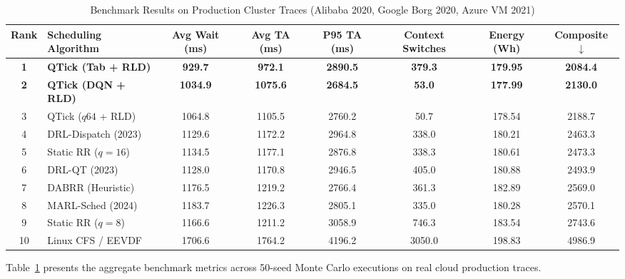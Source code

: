 \documentclass[journal]{IEEEtran}
\begin{document}
\begin{table}[t]
\centering
\caption{Benchmark Results on Production Cluster Traces (Alibaba 2020, Google Borg 2020, Azure VM 2021)}
\label{tab:benchmark_real}
\begin{tabular}{clcccccc}
\toprule
\textbf{Rank} & \textbf{Scheduling Algorithm} & \textbf{Avg Wait (ms)} & \textbf{Avg TA (ms)} & \textbf{P95 TA (ms)} & \textbf{Context Switches} & \textbf{Energy (Wh)} & \textbf{Composite $\downarrow$} \\
\midrule
\textbf{1} & \textbf{QTick (Tab + RLD)} & \textbf{929.7} & \textbf{972.1} & \textbf{2890.5} & \textbf{379.3} & \textbf{179.95} & \textbf{2084.4} \\
\textbf{2} & \textbf{QTick (DQN + RLD)} & \textbf{1034.9} & \textbf{1075.6} & \textbf{2684.5} & \textbf{53.0} & \textbf{177.99} & \textbf{2130.0} \\
3 & QTick ($q64$ + RLD) & 1064.8 & 1105.5 & 2760.2 & 50.7 & 178.54 & 2188.7 \\
4 & DRL-Dispatch (2023) & 1129.6 & 1172.2 & 2964.8 & 338.0 & 180.21 & 2463.3 \\
5 & Static RR ($q=16$) & 1134.5 & 1177.1 & 2876.8 & 338.3 & 180.61 & 2473.3 \\
6 & DRL-QT (2023) \cite{zhang2023deep} & 1128.0 & 1170.8 & 2946.5 & 405.0 & 180.88 & 2493.9 \\
7 & DABRR (Heuristic) & 1176.5 & 1219.2 & 2766.4 & 361.3 & 182.89 & 2569.0 \\
8 & MARL-Sched (2024) \cite{chen2023multi} & 1183.7 & 1226.3 & 2805.1 & 335.0 & 180.28 & 2570.1 \\
9 & Static RR ($q=8$) & 1166.6 & 1211.2 & 3058.9 & 746.3 & 183.54 & 2743.6 \\
10 & Linux CFS / EEVDF \cite{zijlstra2023eevdf} & 1706.6 & 1764.2 & 4196.2 & 3050.0 & 198.83 & 4986.9 \\
\bottomrule
\end{tabular}
\end{table}

Table~\ref{tab:benchmark_real} presents the aggregate benchmark metrics across 50-seed Monte Carlo executions on real cloud production traces.
\end{document}
